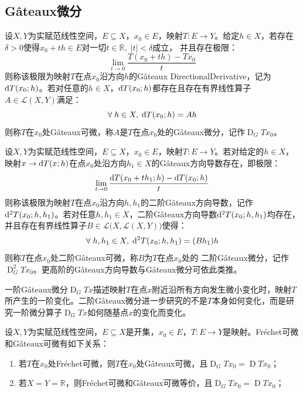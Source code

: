 \subsection{G\^ateaux微分}
\begin{definition}
	设$X,Y$为实赋范线性空间，$E\subseteq X$，$x_0\in E$，映射$T:E\to Y$。给定$h\in X$，若存在$\delta>0$使得$x_0+th\in E$对一切$t\in\mathbb{R},\;|t|<\delta$成立，
	并且存在极限：
	\begin{equation*}
		\lim_{t\to0}\frac{T(x_0+th)-Tx_0}{t}
	\end{equation*}
	则称该极限为映射$T$在点$x_0$沿方向$h$的G\^ateaux \gls{DirectionalDerivative}，记为$\mathop{}\!\mathrm{d} T(x_0;h)$。若对任意的$h\in X$，$\mathop{}\!\mathrm{d} T(x_0;h)$都存在且存在有界线性算子$A\in\mathcal{L}(X,Y)$满足：
	\begin{equation*}
		\forall\;h\in X,\;\mathop{}\!\mathrm{d} T(x_0;h)=Ah
	\end{equation*}
	则称$T$在$x_0$处G\^ateaux可微，称$A$是$T$在点$x_0$处的G\^ateaux微分，记作$\operatorname{D}_GTx_0$。
\end{definition}
\begin{definition}
	设$X,Y$为实赋范线性空间，$E\subseteq X$，$x_0\in E$，映射$T:E\to Y$。若对给定的$h\in X$，映射$x\to\mathop{}\!\mathrm{d} T(x;h)$在点$x_0$处沿方向$h_1\in X$的G\^ateaux方向导数存在，即极限：
	\begin{equation*}
		\lim_{t\to0}\frac{\mathop{}\!\mathrm{d} T(x_0+th_1;h)-\mathop{}\!\mathrm{d} T(x_0;h)}{t}
	\end{equation*}
	则称该极限为映射$T$在点$x_0$沿方向$h,h_1$的二阶G\^ateaux方向导数，记作$\mathop{}\!\mathrm{d}^2T(x_0;h,h_1)$。若对任意$h,h_1\in X$，二阶G\^ateaux方向导数$\mathop{}\!\mathrm{d}^2T(x_0;h,h_1)$均存在，并且存在有界线性算子$B\in\mathcal{L}\bigl(X,\mathcal{L}(X,Y)\bigr)$使得：
	\begin{equation*}
		\forall\;h,h_1\in X,\;\mathop{}\!\mathrm{d}^2T(x_0;h,h_1)=(Bh_1)h
	\end{equation*}
	则称$T$在点$x_0$处二阶G\^ateaux可微，称$B$为$T$在点$x_0$处的
	二阶G\^ateaux微分，记作$\operatorname{D}_G^2Tx_0$。更高阶的G\^ateaux方向导数与G\^ateaux微分可依此类推。
\end{definition}
\begin{note}
	一阶G\^ateaux微分$\operatorname{D}_GTx$描述映射$T$在点$x$附近沿所有方向发生微小变化时，映射$T$所产生的一阶变化。二阶G\^ateaux微分进一步研究的不是$T$本身如何变化，而是研究一阶微分算子$\operatorname{D}_GTx$如何随基点$x$的变化而变化。
\end{note}
\begin{property}\label{prop:FrechetGateaux}
	设$X,Y$为实赋范线性空间，$E\subseteq X$是开集，$x_0\in E$，$T:E\to Y$是映射。Fr\'echet可微和G\^ateaux可微有如下关系：
	\begin{enumerate}
		\item 若$T$在$x_0$处Fr\'echet可微，则$T$在$x_0$处G\^ateaux可微，且$\operatorname{D}_GTx_0=\operatorname{D}Tx_0$；
		\item 若$X=Y=\mathbb{R}$，则Fr\'echet可微和G\^ateaux可微等价，且$\operatorname{D}_GTx_0=\operatorname{D}Tx_0$；
	\end{enumerate}
\end{property}

